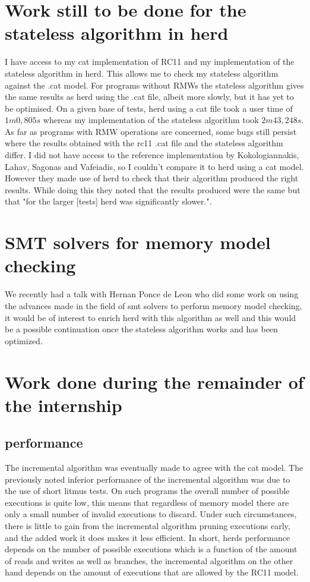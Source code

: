 \documentclass[a4,11pt,dvipsnames]{article}
\begin{document}
\section{Work still to be done for the stateless algorithm in herd}

I have access to my cat implementation of RC11 and my implementation of the stateless algorithm in herd. This allows me to check my stateless algorithm against the .cat model. For programs without RMWs the stateless algorithm gives the same results as herd using the .cat file, albeit more slowly, but it has yet to be optimised. On a given base of tests, herd using a cat file took a user time of $1m0,805s$ whereas my implementation of the stateless algorithm took $2m43,248s$. As far as programs with RMW operations are concerned, some bugs still persist where the results obtained with the rc11 .cat file and the stateless algorithm differ. I did not have access to the reference implementation by Kokologiannakis, Lahav, Sagonas and Vafeiadis, so I couldn't compare it to herd using a cat model. However they made use of herd to check that their algorithm produced the right results. While doing this they noted that the results produced were the same but that "for the larger [tests] herd was significantly slower.".

\section{SMT solvers for memory model checking}

We recently had a talk with Hernan Ponce de Leon who did some work on using the advances made in the field of smt solvers to perform memory model checking, it would be of interest to enrich herd with this algorithm as well and this would be a possible continuation once the stateless algorithm works and has been optimized.

\section{Work done during the remainder of the internship}

\subsection{performance}

The incremental algorithm was eventually made to agree with the cat model. The previously noted inferior performance of the incremental algorithm was due to the use of short litmus tests. On such programs the overall number of possible executions is quite low, this means that regardless of memory model there are only a small number of invalid executions to discard. Under such circumstances, there is little to gain from the incremental algorithm pruning executions early, and the added work it does makes it less efficient. In short, herds performance depends on the number of possible executions which is a function of the amount of reads and writes as well as branches, the incremental algorithm on the other hand depends on the amount of executions that are allowed by the RC11 model.
\end{document}
